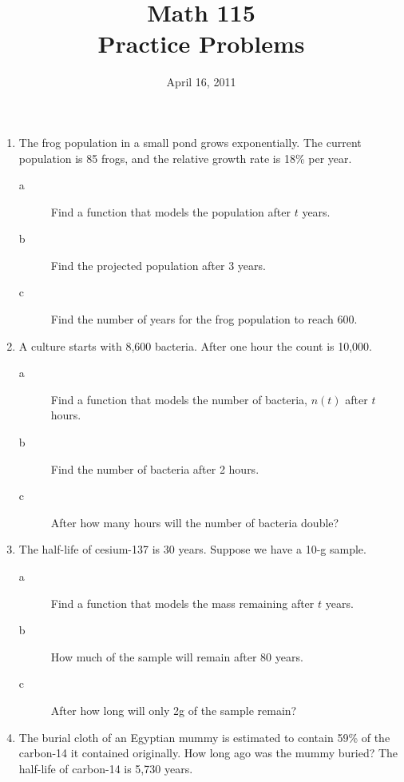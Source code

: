 \documentclass[fleqn,addpoints]{exam}
\title{Math 115 \\ Practice Problems}
\date{April 16, 2011}
\begin{document}
\maketitle

\begin{enumerate}

\item

The frog population in a small pond grows exponentially.  The current population is 85 frogs, and the relative growth rate is 18\% per year.

\begin{description}
\item[a]
Find a function that models the population after $t$ years.

\item[b]
Find the projected population after 3 years.

\item[c]
Find the number of years for the frog population to reach 600.

\end{description}

\vspace{2 in}

\item
A culture starts with 8,600 bacteria.  After one hour the count is 10,000.

\begin{description}
\item[a]
Find a function that models the number of bacteria, $n(t)$ after $t$ hours.

\item[b]
Find the number of bacteria after 2 hours.

\item[c]
After how many hours will the number of bacteria double?

\end{description}

\vspace{2 in}

\pagebreak

\item
The half-life of cesium-137 is 30 years.  Suppose we have a 10-g sample.

\begin{description}
\item[a]
Find a function that models the mass remaining after $t$ years.

\item[b]
How much of the sample will remain after 80 years.

\item[c]
After how long will only 2g of the sample remain?

\end{description}

\vspace{3 in}

\item
The burial cloth of an Egyptian mummy is estimated to contain 59\% of the carbon-14 it contained originally.  How long
ago was the mummy buried?  The half-life of carbon-14 is 5,730 years.

\end{enumerate}
\end{document}
